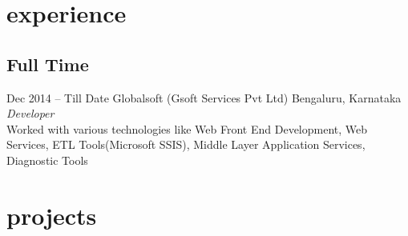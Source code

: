 \documentclass[print]{friggeri-cv} %
\begin{document}

\section{experience}

\subsection{Full Time}

\begin{entrylist}


\entry
{Dec 2014 -- Till Date }
{Globalsoft {\normalfont(Gsoft Services Pvt Ltd)}}
{Bengaluru, Karnataka}
{\emph{Developer} \\
Worked with various technologies like Web Front End Development, Web Services, ETL Tools(Microsoft SSIS), Middle Layer Application Services, Diagnostic Tools }

\end{entrylist}



\section{projects}
\end{document}
